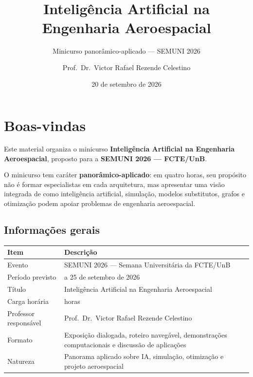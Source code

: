 \documentclass[
  brazilian,
  a4paper,
  DIV=11,
  numbers=noendperiod]{scrreprt}
\title{Inteligência Artificial na Engenharia Aeroespacial}
\subtitle{Minicurso panorâmico-aplicado --- SEMUNI 2026}
\author{Prof.~Dr.~Victor Rafael Rezende Celestino}
\date{20 de setembro de 2026}
\newcounter{none} %
\renewcommand*\contentsname{Índice}
\newcommand\contentsname{Índice}
\begin{document}
\maketitle

\renewcommand*\contentsname{Índice}
{
\setcounter{tocdepth}{2}
\tableofcontents
}


\chapter*{Boas-vindas}\label{boas-vindas}


Este material organiza o minicurso \textbf{Inteligência Artificial na
Engenharia Aeroespacial}, proposto para a \textbf{SEMUNI 2026 ---
FCTE/UnB}.

O minicurso tem caráter \textbf{panorâmico-aplicado}: em quatro horas,
seu propósito não é formar especialistas em cada arquitetura, mas
apresentar uma visão integrada de como inteligência artificial,
simulação, modelos substitutos, grafos e otimização podem apoiar
problemas de engenharia aeroespacial.

\section*{Informações gerais}\label{informauxe7uxf5es-gerais}


{\def\LTcaptype{none} %
\begin{longtable}[]{@{}
  >{\raggedright\arraybackslash}p{}
  >{\raggedright\arraybackslash}p{}@{}}
\toprule\noalign{}
\begin{minipage}[b]{\linewidth}\raggedright
Item
\end{minipage} & \begin{minipage}[b]{\linewidth}\raggedright
Descrição
\end{minipage} \\
\midrule\noalign{}
\endhead
\bottomrule\noalign{}
\endlastfoot
Evento & SEMUNI 2026 --- Semana Universitária da FCTE/UnB \\
Período previsto & 20 a 25 de setembro de 2026 \\
Título & Inteligência Artificial na Engenharia Aeroespacial \\
Carga horária & 4 horas \\
Professor responsável & Prof.~Dr.~Victor Rafael Rezende Celestino \\
Formato & Exposição dialogada, roteiro navegável, demonstrações
computacionais e discussão de aplicações \\
Natureza & Panorama aplicado sobre IA, simulação, otimização e projeto
aeroespacial \\
\end{longtable}
}
\end{document}
